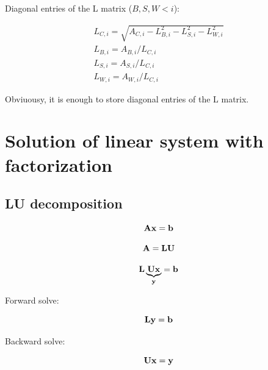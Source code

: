 \documentclass{report}
\begin{document}
Diagonal entries of the L matrix ($B, S, W < i$):

\begin{eqnarray}
  L_{C,i} = \sqrt{A_{C,i} - L_{B,i}^2 - L_{S,i}^2 - L_{W,i}^2} \\
  L_{B,i} = A_{B,i} / L_{C,i}                                  \\
  L_{S,i} = A_{S,i} / L_{C,i}                                  \\
  L_{W,i} = A_{W,i} / L_{C,i}
\end{eqnarray}

Obviuousy, it is enough to store diagonal entries of the L matrix.

\section{Solution of linear system with factorization}

\subsection{LU decomposition}

\begin{equation}
  \bf{A} \bf{x} = \bf{b}
\end{equation}

\begin{equation}
  \bf{A} = \bf{L} \bf{U}
\end{equation}

\begin{equation}
  \bf{L} \underbrace{\bf{U} \bf{x}}_y  = \bf{b}
\end{equation}

Forward solve:

\begin{equation}
  \bf{L} y  = \bf{b}
\end{equation}

Backward solve:

\begin{equation}
  \bf{U} x  = \bf{y}
\end{equation}

\end{document}
